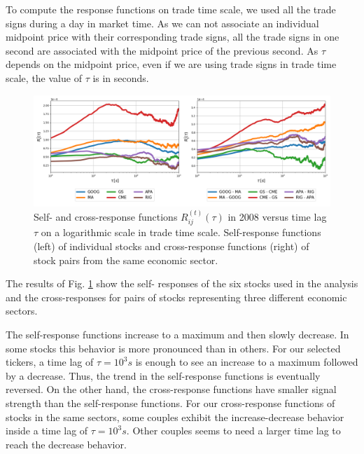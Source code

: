 To compute the response functions on trade time scale, we used all the trade
signs during a day in market time. As we can not associate an individual
midpoint price with their corresponding trade signs, all the trade signs in one
second are associated with the midpoint price of the previous second.
As $\tau$ depends on the midpoint price, even if we are using trade signs in
trade time scale, the value of $\tau$ is in seconds.

\begin{figure}[htbp]
    \centering
    \includegraphics[width=\textwidth]
    {figures/03_responses_trade_scale_2008.png}
    \caption{Self- and cross-response functions
             $R^{\left(t\right)}_{ij}\left(\tau\right)$ in 2008 versus time lag
             $\tau$ on a logarithmic scale in trade time scale. Self-response
             functions (left) of individual stocks and cross-response functions
             (right) of stock pairs from the same economic sector.}
    \label{fig:response_function_trade_scale}
\end{figure}

The results of Fig. \ref{fig:response_function_trade_scale} show the self-
responses of the six stocks used in the analysis and the cross-responses for
pairs of stocks representing three different economic sectors.

The self-response functions increase to a maximum and then slowly decrease. In
some stocks this behavior is more pronounced than in others. For our selected
tickers, a time lag of $\tau = 10^{3}s$ is enough to see an increase to a
maximum followed by a decrease. Thus, the trend in the self-response functions
is eventually reversed.
On the other hand, the cross-response functions have smaller signal strength
than the self-response functions. For our cross-response functions of stocks in
the same sectors, some couples exhibit the increase-decrease behavior inside a
time lag of $\tau = 10^{3}s$. Other couples seems to need a larger time lag to
reach the decrease behavior.

